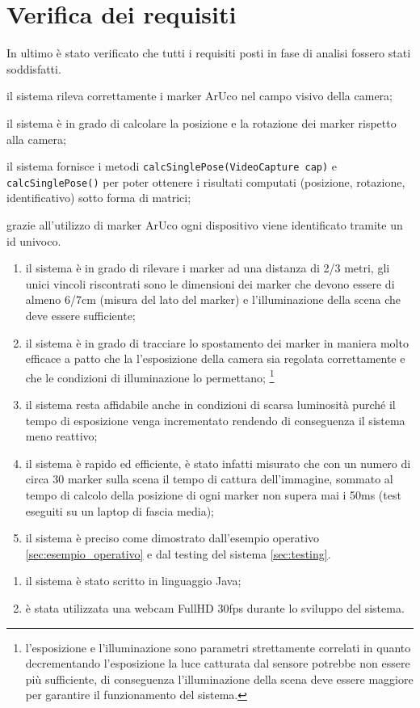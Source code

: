 \documentclass[12pt,a4paper,openright,twoside]{book}
\begin{document}
\section{Verifica dei requisiti} \label{sec:verifica_dei_requisiti}
In ultimo è stato verificato che tutti i requisiti posti in fase di analisi fossero stati soddisfatti.
\begin{enumerate}[label=RF\arabic*]
	\item il sistema rileva correttamente i marker ArUco nel campo visivo della camera;
	\item il sistema è in grado di calcolare la posizione e la rotazione dei marker rispetto alla camera;
	\begin{sloppypar}
		\item il sistema fornisce i metodi \texttt{calcSinglePose(VideoCapture cap)} e \texttt{calcSinglePose()} per poter ottenere i risultati computati (posizione, rotazione, identificativo) sotto forma di matrici;
	\end{sloppypar}
	\item grazie all'utilizzo di marker ArUco ogni dispositivo viene identificato tramite un id univoco.
\end{enumerate} 
\begin{enumerate}[label=RNF\arabic*]
	\item il sistema è in grado di rilevare i marker ad una distanza di 2/3 metri, gli unici vincoli riscontrati sono le dimensioni dei marker che devono essere di almeno 6/7cm (misura del lato del marker) e l'illuminazione della scena che deve essere sufficiente;
	\item il sistema è in grado di tracciare lo spostamento dei marker in maniera molto efficace a patto che la l'esposizione della camera sia regolata correttamente e che le condizioni di illuminazione lo permettano; \footnote{l'esposizione e l'illuminazione sono parametri strettamente correlati in quanto decrementando l'esposizione la luce catturata dal sensore potrebbe non essere più sufficiente, di conseguenza l'illuminazione della scena deve essere maggiore per garantire il funzionamento del sistema.}
	\item il sistema resta affidabile anche in condizioni di scarsa luminosità purché il tempo di esposizione venga incrementato rendendo di conseguenza il sistema meno reattivo;
	\item il sistema è rapido ed efficiente, è stato infatti misurato che con un numero di circa 30 marker sulla scena il tempo di cattura dell'immagine, sommato al tempo di calcolo della posizione di ogni marker non supera mai i 50ms (test eseguiti su un laptop di fascia media);
	\item il sistema è preciso come dimostrato dall'esempio operativo \ref{sec:esempio_operativo} e dal testing del sistema \ref{sec:testing}.
\end{enumerate} 
\begin{enumerate}[label=RT\arabic*]
	\item il sistema è stato scritto in linguaggio Java;
	\item è stata utilizzata una webcam FullHD 30fps durante lo sviluppo del sistema.
\end{enumerate} 
\end{document}
